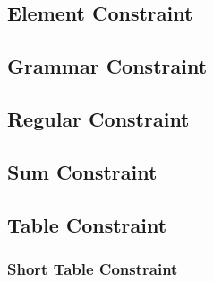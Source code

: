 \documentclass[../Document.tex]{subfiles}
\begin{document}
\subsection{Element Constraint}

\subsection{Grammar Constraint}

\subsection{Regular Constraint}

\subsection{Sum Constraint}

\subsection{Table Constraint}
\subsubsection{Short Table Constraint}
\end{document}
